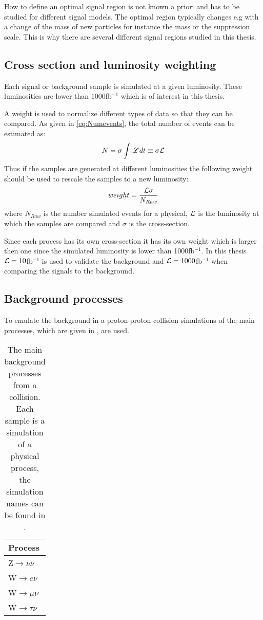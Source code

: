 How to define an optimal signal region is not known a priori and has to be studied for different signal models. The optimal region typically changes e.g with a change of the mass of new particles for instance the \abbrWIMP mass or the suppression scale. This is why there are several different signal regions studied in this thesis.

\subsection{Cross section and luminosity weighting}
Each signal or background sample is simulated at a given luminosity. These luminosities are lower than $1000$fb$^{-1}$ which is of interest in this thesis. 

A weight is used to normalize different types of data so that they can be compared. 
As given in \eqref{eq:Numevents}, the total number of events can be estimated as:
\begin{equation*}
N=\sigma \int \mathscr{L} dt \equiv \sigma \mathcal{L}
\end{equation*}
Thus if the samples are generated at different luminosities the following weight should be used to rescale the samples to a new luminosity:
\begin{equation}
weight=\frac{\mathcal{L} \sigma}{N_{Raw}}
\end{equation}
where $N_{Raw}$ is the number simulated events for a physical, $\mathcal{L}$ is the luminosity at which the samples are compared and $\sigma$ is the cross-section. 

Since each process has its own cross-section it has its own weight which is larger then one since the simulated luminosity is lower than 1000fb$^{-1}$.
In this thesis $\mathcal{L}=10$fb$^{-1}$ is used to validate the background and $\mathcal{L}=1000$fb$^{-1}$ when comparing the signals to the background.


\subsection{Background processes}
To emulate the background in a proton-proton collision simulations of the main processes, which are given in , are used. 
\begin{table}[ht]
\begin{tabular}{|l|}
\hline
Process \\ \hline
Z$\rightarrow \nu \nu$ \\
W$\rightarrow e\nu$ \\
W$\rightarrow \mu \nu$ \\
W$\rightarrow \tau \nu$ \\ \hline
\end{tabular}
\caption{The main background processes from a collision. Each sample is a simulation of a physical process, the simulation names can be found in .}
\label{tab:backproc2}
\end{table}

